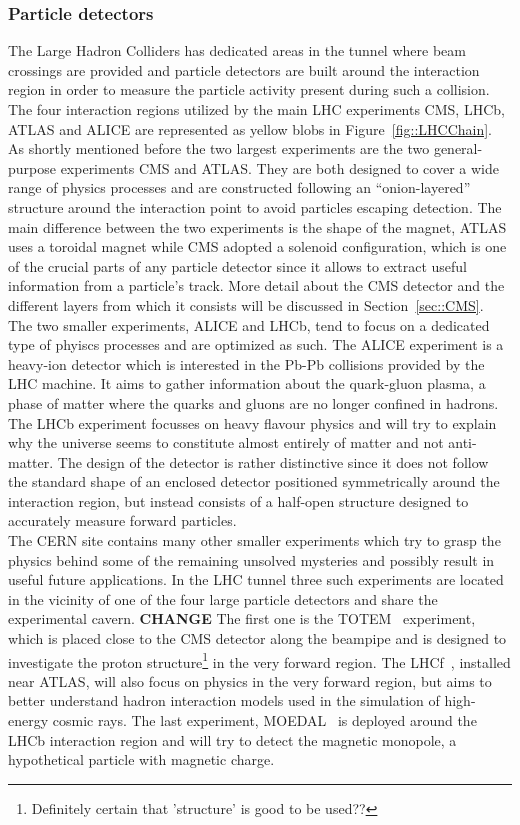 \subsubsection{Particle detectors}
The Large Hadron Colliders has dedicated areas in the tunnel where beam crossings are provided and particle detectors are built around the interaction region in order to measure the particle activity present during such a collision. The four interaction regions utilized by the main LHC experiments CMS, LHCb, ATLAS and ALICE are represented as yellow blobs in Figure~\ref{fig::LHCChain}. 
\\
As shortly mentioned before the two largest experiments are the two general-purpose experiments CMS and ATLAS. They are both designed to cover a wide range of physics processes and are constructed following an ``onion-layered'' structure around the interaction point to avoid particles escaping detection. The main difference between the two experiments is the shape of the magnet, ATLAS uses a toroidal magnet while CMS adopted a solenoid configuration, which is one of the crucial parts of any particle detector since it allows to extract useful information from a particle's track. More detail about the CMS detector and the different layers from which it consists will be discussed in Section~\ref{sec::CMS}.
\\
The two smaller experiments, ALICE and LHCb, tend to focus on a dedicated type of phyiscs processes and are optimized as such. The ALICE experiment is a heavy-ion detector which is interested in the Pb-Pb collisions provided by the LHC machine. It aims to gather information about the quark-gluon plasma, a phase of matter where the quarks and gluons are no longer confined in hadrons. The LHCb experiment focusses on heavy flavour physics and will try to explain why the universe seems to constitute almost entirely of matter and not anti-matter. The design of the detector is rather distinctive since it does not follow the standard shape of an enclosed detector positioned symmetrically around the interaction region, but instead consists of a half-open structure designed to accurately measure forward particles.
\\
The CERN site contains many other smaller experiments which try to grasp the physics behind some of the remaining unsolved mysteries and possibly result in useful future applications. In the LHC tunnel three such experiments are located in the vicinity of one of the four large particle detectors and share the experimental cavern. \textbf{CHANGE}
The first one is the TOTEM~\cite{TotemDetectorPaper} experiment, which is placed close to the CMS detector along the beampipe and is designed to investigate the proton structure\footnote{Definitely certain that 'structure' is good to be used??} in the very forward region. The LHCf~\cite{LHCfDetectorPaper}, installed near ATLAS, will also focus on physics in the very forward region, but aims to better understand hadron interaction models used in the simulation of high-energy cosmic rays.
The last experiment, MOEDAL~\cite{MoedalDetectorPaper} is deployed around the LHCb interaction region and will try to detect the magnetic monopole, a hypothetical particle with magnetic charge.

